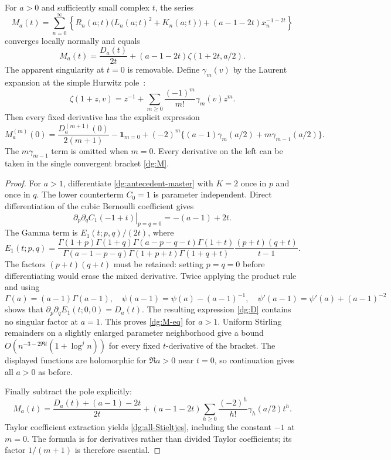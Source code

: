 \begin{theorem}
\label{dg:spectral}
For $a>0$ and sufficiently small complex $t$, the series
\begin{equation}
 M_a(t)=\sum_{n=0}^{\infty}\left\{
 R_n(a;t)\bigl(L_n(a;t)^2+K_n(a;t)\bigr)
 +(a-1-2t)x_n^{-1-2t}\right\}
 \label{dg:M}
\end{equation}
converges locally normally and equals
\begin{equation}
 M_a(t)=\frac{D_a(t)}{2t}
             +(a-1-2t)\zeta(1+2t,a/2).
 \label{dg:M-eq}
\end{equation}
The apparent singularity at $t=0$ is removable. Define $\gamma_m(v)$
by the Laurent expansion at the simple Hurwitz pole~\cite{DLMFHurwitz}:
\[
 \zeta(1+z,v)=z^{-1}+\sum_{m\geq0}\frac{(-1)^m}{m!}\gamma_m(v)z^m.
\]
Then every fixed derivative has the explicit expression
\begin{equation}
 M_a^{(m)}(0)=\frac{D_a^{(m+1)}(0)}{2(m+1)}
 -\mathbf1_{m=0}
 +(-2)^m\{(a-1)\gamma_m(a/2)+m\gamma_{m-1}(a/2)\}.
 \label{dg:all-Stieltjes}
\end{equation}
The $m\gamma_{m-1}$ term is omitted when $m=0$. Every derivative
on the left can be taken in the single convergent bracket
\eqref{dg:M}.
\end{theorem}
\begin{proof}
For $a>1$, differentiate \eqref{dg:antecedent-master} with $K=2$
once in $p$ and once in $q$. The lower counterterm $C_0=1$ is
parameter independent. Direct differentiation of the cubic Bernoulli
coefficient gives
\[
 \left.\partial_p\partial_qC_1(-1+t)\right|_{p=q=0}=-(a-1)+2t.
\]
The Gamma term is $E_1(t;p,q)/(2t)$, where
\[
 E_1(t;p,q)=
 \frac{\Gamma(1+p)\Gamma(1+q)\Gamma(a-p-q-t)\Gamma(1+t)}
 {\Gamma(a-1-p-q)\Gamma(1+p+t)\Gamma(1+q+t)}
                  \frac{(p+t)(q+t)}{t-1}.
\]
The factors $(p+t)(q+t)$ must be retained: setting $p=q=0$
before differentiating would erase the mixed derivative.
Twice applying the product rule and using
\[
 \Gamma(a)=(a-1)\Gamma(a-1),\quad
 \psi(a-1)=\psi(a)-(a-1)^{-1},\quad
 \psi'(a-1)=\psi'(a)+(a-1)^{-2}
\]
shows that $\partial_p\partial_qE_1(t;0,0)=D_a(t)$.
The resulting expression \eqref{dg:D} contains no singular
factor at $a=1$. This proves \eqref{dg:M-eq} for $a>1$.
Uniform Stirling remainders on a slightly enlarged parameter
neighborhood give a bound
$O(n^{-3-2\Re t}(1+\log^j n))$ for every fixed $t$-derivative of
the bracket. The displayed functions are holomorphic for $\Re a>0$
near $t=0$, so continuation gives all $a>0$ as before.

Finally subtract the pole explicitly:
\[
 M_a(t)=\frac{D_a(t)+(a-1)-2t}{2t}
 +(a-1-2t)\sum_{h\geq0}\frac{(-2)^h}{h!}\gamma_h(a/2)t^h.
\]
Taylor coefficient extraction yields
\eqref{dg:all-Stieltjes}, including the constant $-1$ at
$m=0$. The formula is for derivatives rather than divided Taylor
coefficients; its factor $1/(m+1)$ is therefore essential.
\end{proof}

